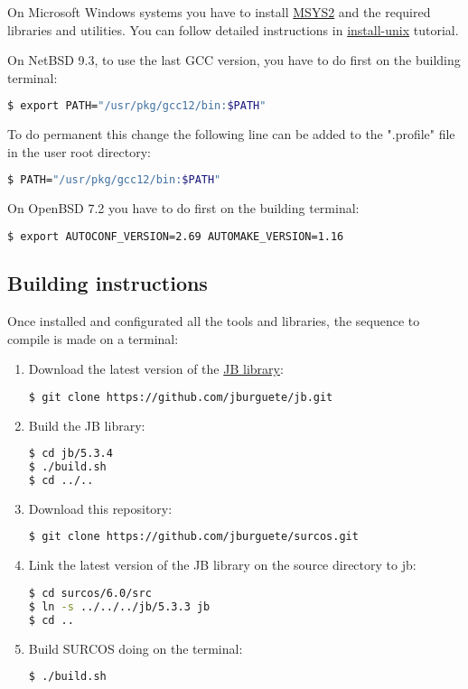 On Microsoft Windows systems you have to install
\href{http://sourceforge.net/projects/msys2}{MSYS2} and the required
libraries and utilities. You can follow detailed instructions in
\href{https://github.com/jburguete/install-unix/blob/master/tutorial.pdf}{install-unix}
tutorial.

On NetBSD 9.3, to use the last GCC version, you have to do first on the
building terminal:
\begin{lstlisting}[language=bash]
$ export PATH="/usr/pkg/gcc12/bin:$PATH"
\end{lstlisting}

To do permanent this change the following line can be added to the ".profile"
file in the user root directory:
\begin{lstlisting}[language=bash]
$ PATH="/usr/pkg/gcc12/bin:$PATH"
\end{lstlisting}

On OpenBSD 7.2 you have to do first on the building terminal:
\begin{lstlisting}[language=bash]
$ export AUTOCONF_VERSION=2.69 AUTOMAKE_VERSION=1.16
\end{lstlisting}

\subsection{Building instructions}

Once installed and configurated all the tools and libraries, the sequence to
compile is made on a terminal:

\begin{enumerate}

\item Download the latest version of the
\href{https://github.com/jburguete/jb}{JB library}:
\begin{lstlisting}[language=bash]
$ git clone https://github.com/jburguete/jb.git
\end{lstlisting}

\item Build the JB library:
\begin{lstlisting}[language=bash]
$ cd jb/5.3.4
$ ./build.sh
$ cd ../..
\end{lstlisting}

\item Download this repository:
\begin{lstlisting}[language=bash]
$ git clone https://github.com/jburguete/surcos.git
\end{lstlisting}

\item Link the latest version of the JB library on the source directory to jb:
\begin{lstlisting}[language=bash]
$ cd surcos/6.0/src
$ ln -s ../../../jb/5.3.3 jb
$ cd ..
\end{lstlisting}

\item Build SURCOS doing on the terminal:
\begin{lstlisting}[language=bash]
$ ./build.sh
\end{lstlisting}

\end{enumerate}
